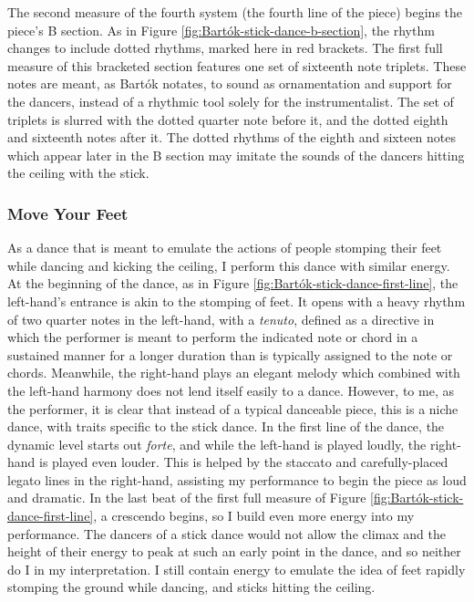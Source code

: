 The second measure of the fourth system (the fourth line of the piece) begins the piece's B section. As in Figure \ref{fig:Bartók-stick-dance-b-section}\autocite{Lung_2016}, the rhythm changes to include dotted rhythms, marked here in red brackets. The first full measure of this bracketed section features one set of sixteenth note triplets. These notes are meant, as Bartók notates, to sound as ornamentation and support for the dancers, instead of a rhythmic tool solely for the instrumentalist. The set of triplets is slurred with the dotted quarter note before it, and the dotted eighth and sixteenth notes after it. The dotted rhythms of the eighth and sixteen notes which appear later in the B section may imitate the sounds of the dancers hitting the ceiling with the stick.

\subsubsection{Move Your Feet}

As a dance that is meant to emulate the actions of people stomping their feet while dancing and kicking the ceiling, I perform this dance with similar energy. At the beginning of the dance, as in Figure \ref{fig:Bartók-stick-dance-first-line}\autocite{Lung_2016}, the left-hand's entrance is akin to the stomping of feet. It opens with a heavy rhythm of two quarter notes in the left-hand, with a \textit{tenuto}, defined as a directive in which the performer is meant to perform the indicated note or chord in a sustained manner for a longer duration than is typically assigned to the note or chords. Meanwhile, the right-hand plays an elegant melody which combined with the left-hand harmony does not lend itself easily to a dance. However, to me, as the performer, it is clear that instead of a typical danceable piece, this is a niche dance, with traits specific to the stick dance. In the first line of the dance, the dynamic level starts out \textit{forte}, and while the left-hand is played loudly, the right-hand is played even louder. This is helped by the staccato and carefully-placed legato lines in the right-hand, assisting my performance to begin the piece as loud and dramatic. In the last beat of the first full measure of Figure \ref{fig:Bartók-stick-dance-first-line}\autocite{Lung_2016}, a crescendo begins, so I build even more energy into my performance. The dancers of a stick dance would not allow the climax and the height of their energy to peak at such an early point in the dance, and so neither do I in my interpretation. I still contain energy to emulate the idea of feet rapidly stomping the ground while dancing, and sticks hitting the ceiling. 

